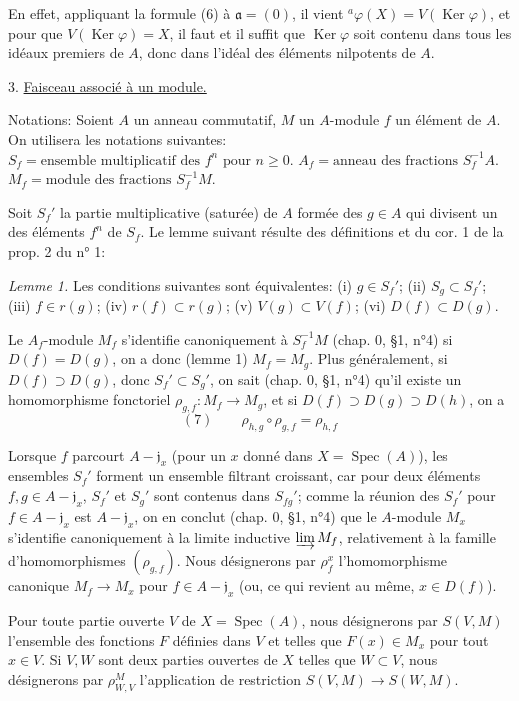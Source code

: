 En effet, appliquant la formule (6) à $\mathfrak{a} = (0)$, il vient $^a\varphi(X) = V(\operatorname{Ker} \varphi)$, et pour que $V(\operatorname{Ker} \varphi) = X$, il faut et il suffit que $\operatorname{Ker} \varphi$ soit contenu dans tous les idéaux premiers de $A$, donc dans l'idéal des éléments nilpotents de $A$.

\medskip

3. \underline{Faisceau associé à un module.}

Notations: Soient $A$ un anneau commutatif, $M$ un $A$-module $f$ un élément de $A$.
On utilisera les notations suivantes:
$S_f = \text{ensemble multiplicatif des } f^n \text{ pour } n \ge 0$.
$A_f = \text{anneau des fractions } S_f^{-1}A$.
$M_f = \text{module des fractions } S_f^{-1}M$.

Soit $S_f'$ la partie multiplicative (saturée) de $A$ formée des $g \in A$ qui divisent un des éléments $f^n$ de $S_f$. Le lemme suivant résulte des définitions et du cor. 1 de la prop. 2 du n° 1:

\emph{Lemme 1.} Les conditions suivantes sont équivalentes:
(i) $g \in S_f'$; (ii) $S_g \subset S_f'$; (iii) $f \in r(g)$; (iv) $r(f) \subset r(g)$; (v) $V(g) \subset V(f)$; (vi) $D(f) \subset D(g)$.

\newpage


Le $A_f$-module $M_f$ s'identifie canoniquement à $S_f^{-1}M$ (chap. 0, §1, n°4) si $D(f) = D(g)$, on a donc (lemme 1) $M_f = M_g$. Plus généralement, si $D(f) \supset D(g)$, donc $S_f' \subset S_g'$, on sait (chap. 0, §1, n°4) qu'il existe un homomorphisme fonctoriel $\rho_{g,f} : M_f \to M_g$, et si $D(f) \supset D(g) \supset D(h)$, on a
$$(7) \qquad \rho_{h,g} \circ \rho_{g,f} = \rho_{h,f}$$

Lorsque $f$ parcourt $A - \mathfrak{j}_x$ (pour un $x$ donné dans $X = \operatorname{Spec}(A)$), les ensembles $S_f'$ forment un ensemble filtrant croissant, car pour deux éléments $f,g \in A - \mathfrak{j}_x$, $S_f'$ et $S_g'$ sont contenus dans $S_{fg}'$; comme la réunion des $S_f'$ pour $f \in A - \mathfrak{j}_x$ est $A - \mathfrak{j}_x$, on en conclut (chap. 0, §1, n°4) que le $A$-module $M_x$ s'identifie canoniquement à la limite inductive $\varinjlim M_f$, relativement à la famille d'homomorphismes $(\rho_{g,f})$. Nous désignerons par $\rho_f^x$ l'homomorphisme canonique $M_f \to M_x$ pour $f \in A - \mathfrak{j}_x$ (ou, ce qui revient au même, $x \in D(f)$).

Pour toute partie ouverte $V$ de $X = \operatorname{Spec}(A)$, nous désignerons par $S(V,M)$ l'ensemble des fonctions $F$ définies dans $V$ et telles que $F(x) \in M_x$ pour tout $x \in V$. Si $V,W$ sont deux parties ouvertes de $X$ telles que $W \subset V$, nous désignerons par $\rho_{W,V}^M$ l'application de restriction $S(V,M) \to S(W,M)$.

